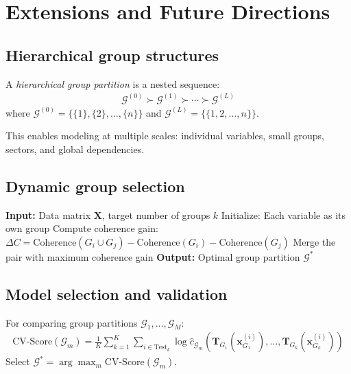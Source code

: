 \section{Extensions and Future Directions}
\subsection{Hierarchical group structures}
\begin{definition}
A \emph{hierarchical group partition} is a nested sequence:
\begin{align}
\mathcal{G}^{(0)} \succ \mathcal{G}^{(1)} \succ \cdots \succ \mathcal{G}^{(L)}
\end{align}
where $\mathcal{G}^{(0)} = \{\{1\}, \{2\}, \ldots, \{n\}\}$ and $\mathcal{G}^{(L)} = \{\{1, 2, \ldots, n\}\}$.
\end{definition}
This enables modeling at multiple scales: individual variables, small groups, sectors, and global dependencies.

\subsection{Dynamic group selection}
\begin{algorithm}[H]
\caption{Adaptive Group Selection}
\begin{algorithmic}[1]
\State \textbf{Input:} Data matrix $\mathbf{X}$, target number of groups $k$
\State Initialize: Each variable as its own group
        \State Compute coherence gain: $\Delta C = \text{Coherence}(G_i \cup G_j) - \text{Coherence}(G_i) - \text{Coherence}(G_j)$
    \EndFor
    \State Merge the pair with maximum coherence gain
\EndWhile
\State \textbf{Output:} Optimal group partition $\mathcal{G}^*$
\end{algorithmic}
\end{algorithm}

\subsection{Model selection and validation}
\begin{definition}
For comparing group partitions $\mathcal{G}_1, \ldots, \mathcal{G}_M$:
\begin{align}
\text{CV-Score}(\mathcal{G}_m) = \frac{1}{K} \sum_{k=1}^K \sum_{i \in \text{Test}_k} \log \hat{c}_{\mathcal{G}_m}(\mathbf{T}_{G_1}(\mathbf{x}_{G_1}^{(i)}), \ldots, \mathbf{T}_{G_k}(\mathbf{x}_{G_k}^{(i)}))
\end{align}
Select $\mathcal{G}^* = \arg\max_m \text{CV-Score}(\mathcal{G}_m)$.
\end{definition}

